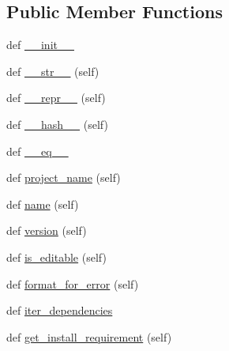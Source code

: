 \subsection*{Public Member Functions}
\begin{DoxyCompactItemize}
\item 
def \hyperlink{classpip_1_1__internal_1_1resolution_1_1resolvelib_1_1candidates_1_1AlreadyInstalledCandidate_a3261e5891a5b2a1c5a38ffeb9a7d2d99}{\+\_\+\+\_\+init\+\_\+\+\_\+}
\item 
def \hyperlink{classpip_1_1__internal_1_1resolution_1_1resolvelib_1_1candidates_1_1AlreadyInstalledCandidate_af8d849e2a8006453d9bfd6af82492b3c}{\+\_\+\+\_\+str\+\_\+\+\_\+} (self)
\item 
def \hyperlink{classpip_1_1__internal_1_1resolution_1_1resolvelib_1_1candidates_1_1AlreadyInstalledCandidate_a71138c130c4222f5575f91313c55b11f}{\+\_\+\+\_\+repr\+\_\+\+\_\+} (self)
\item 
def \hyperlink{classpip_1_1__internal_1_1resolution_1_1resolvelib_1_1candidates_1_1AlreadyInstalledCandidate_a999c3e651ad2b86178fbbb8364b824c4}{\+\_\+\+\_\+hash\+\_\+\+\_\+} (self)
\item 
def \hyperlink{classpip_1_1__internal_1_1resolution_1_1resolvelib_1_1candidates_1_1AlreadyInstalledCandidate_ac4d73950e7895a28cc3e047089e04046}{\+\_\+\+\_\+eq\+\_\+\+\_\+}
\item 
def \hyperlink{classpip_1_1__internal_1_1resolution_1_1resolvelib_1_1candidates_1_1AlreadyInstalledCandidate_ad1d197ba2df284170544a21854fa6bc4}{project\+\_\+name} (self)
\item 
def \hyperlink{classpip_1_1__internal_1_1resolution_1_1resolvelib_1_1candidates_1_1AlreadyInstalledCandidate_aa2650f279e8f46c52e374ff4ae7add58}{name} (self)
\item 
def \hyperlink{classpip_1_1__internal_1_1resolution_1_1resolvelib_1_1candidates_1_1AlreadyInstalledCandidate_ad506dc929891b3383eeb597fc02aa416}{version} (self)
\item 
def \hyperlink{classpip_1_1__internal_1_1resolution_1_1resolvelib_1_1candidates_1_1AlreadyInstalledCandidate_a0eb2e7ef8fe17e19abef5f9560f63c0e}{is\+\_\+editable} (self)
\item 
def \hyperlink{classpip_1_1__internal_1_1resolution_1_1resolvelib_1_1candidates_1_1AlreadyInstalledCandidate_aa2a0b2beec129de5f253ee29a83b27dc}{format\+\_\+for\+\_\+error} (self)
\item 
def \hyperlink{classpip_1_1__internal_1_1resolution_1_1resolvelib_1_1candidates_1_1AlreadyInstalledCandidate_a051e8f9103d320f9ddb926b6933b2941}{iter\+\_\+dependencies}
\item 
def \hyperlink{classpip_1_1__internal_1_1resolution_1_1resolvelib_1_1candidates_1_1AlreadyInstalledCandidate_a358195fbe86c66f0dd9c22915751a717}{get\+\_\+install\+\_\+requirement} (self)
\end{DoxyCompactItemize}
